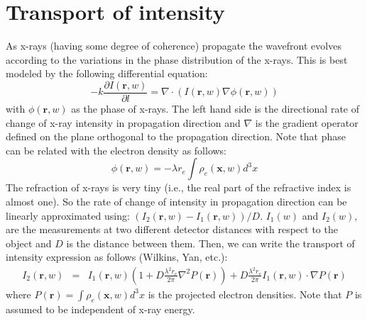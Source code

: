 \documentclass[12pt]{article}
\begin{document}
\section{Transport of intensity}
As x-rays (having some degree of coherence) propagate the wavefront evolves according to the variations in the phase distribution of the x-rays. This is best modeled by the following differential equation:
\begin{equation}
 -k\frac{\partial I(\textbf{r},w)}{\partial l}=\nabla\cdot\left(I(\textbf{r},w)\nabla\phi(\textbf{r},w)\right)
\end{equation}
with $\phi(\textbf{r},w)$ as the phase of x-rays. The left hand side is the directional rate of change of x-ray intensity in propagation direction and $\nabla$ is the gradient operator defined on the plane orthogonal to the propagation direction. Note that phase can be related with the electron density as follows:
\begin{equation}
 \phi(\textbf{r},w) = -\lambda r_e\int\rho_e(\textbf{x},w)d^3x
\end{equation}
The refraction of x-rays is very tiny (i.e., the real part of the refractive index is almost one). So the rate of change of intensity in propagation direction can be linearly approximated using: $(I_2(\textbf{r},w)-I_1(\textbf{r},w))/D$. $I_1(w)$ and $I_2(w)$, are the measurements at two different detector distances with respect to the object and $D$ is the distance between them. Then, we can write the transport of intensity expression as follows (Wilkins, Yan, etc.):
\begin{eqnarray}
 I_2(\textbf{r},w) &=& I_1(\textbf{r},w)\left(1 +D\frac{\lambda^2r_e}{2\pi}\nabla^2P(\textbf{r})\right)  +D\frac{\lambda^2r_e}{2\pi}I_1(\textbf{r},w) \cdot\nabla P(\textbf{r})\nonumber
\label{eqn:tie_complete}
\end{eqnarray}
where $P(\textbf{r})=\int\rho_e(\textbf{x},w)d^3x$ is the projected electron densities. Note that $P$ is assumed to be independent of x-ray energy.
\end{document}
